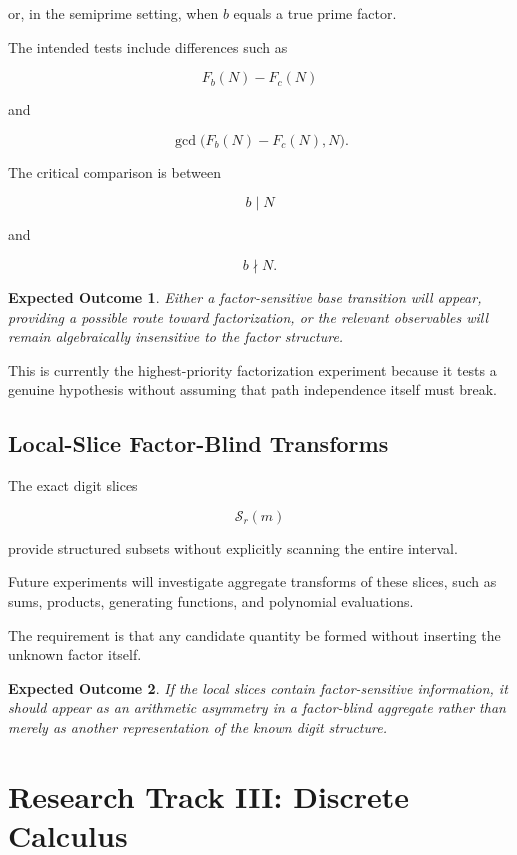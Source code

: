 \documentclass[11pt]{article}
\newtheorem{expectation}{Expected Outcome}
\begin{document}
or, in the semiprime setting, when $b$ equals a true prime factor.

The intended tests include differences such as

$$
F_b(N)-F_c(N)
$$

and

$$
\gcd\bigl(F_b(N)-F_c(N),N\bigr).
$$

The critical comparison is between

$$
b\mid N
$$

and

$$
b\nmid N.
$$

\begin{expectation}
Either a factor-sensitive base transition will appear, providing a possible route toward factorization, or the relevant observables will remain algebraically insensitive to the factor structure.
\end{expectation}

This is currently the highest-priority factorization experiment because it tests a genuine hypothesis without assuming that path independence itself must break.

\subsection{Local-Slice Factor-Blind Transforms}

The exact digit slices

$$
\mathcal{S}_r(m)
$$

provide structured subsets without explicitly scanning the entire interval.

Future experiments will investigate aggregate transforms of these slices, such as sums, products, generating functions, and polynomial evaluations.

The requirement is that any candidate quantity be formed without inserting the unknown factor itself.

\begin{expectation}
If the local slices contain factor-sensitive information, it should appear as an arithmetic asymmetry in a factor-blind aggregate rather than merely as another representation of the known digit structure.
\end{expectation}

\section{Research Track III: Discrete Calculus}
\end{document}
